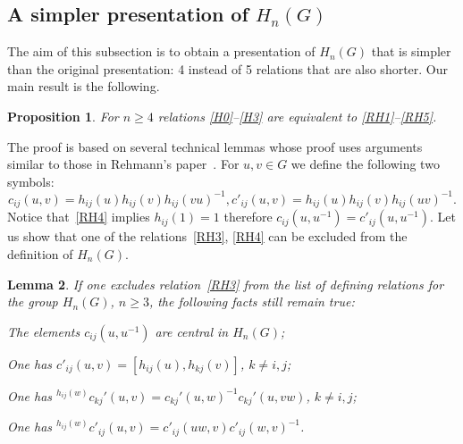 \documentclass[oneside, 12pt]{amsart}
\theoremstyle{plain}
\numberwithin{equation}{section}
\newtheorem{lemma}{Lemma}
\numberwithin{lemma}{section}
\newtheorem{prop}[lemma]{Proposition}
\theoremstyle{remark}
\theoremstyle{definition}
\begin{document}
\subsection{A simpler presentation of $H_n(G)$}
The aim of this subsection is to obtain a presentation of $H_n(G)$ that is simpler than the original presentation: 4 instead of 5 relations that are also shorter. 
Our main result is the following.
\begin{prop} \label{prop:simpler} For $n\geq 4$ %
relations \eqref{H0}--\eqref{H3} are equivalent to \eqref{RH1}--\eqref{RH5}.
\end{prop}
The proof is based on several technical lemmas whose proof uses arguments similar to those in Rehmann's paper~\cite{Reh78}.
For $u, v\in G$ we define the following two symbols:
\[c_{ij}(u,v)=h_{ij}(u)h_{ij}(v)h_{ij}(vu)^{-1}, c'_{ij}(u,v)=h_{ij}(u)h_{ij}(v)h_{ij}(uv)^{-1}.\]
Notice that~\eqref{RH4} implies $h_{ij}(1)=1$ therefore $c_{ij}(u, u^{-1}) = c'_{ij}(u, u^{-1})$.
Let us show that one of the relations~\eqref{RH3}, \eqref{RH4} can be excluded from the definition of $H_n(G)$.
\begin{lemma} \label{item-lem33} If one excludes relation~\eqref{RH3} from the list of defining relations for the group $H_n(G)$, $n\geq 3$,
 the following facts still remain true:
 \begin{lemlist}
\item \label{item-lem33-cntr} The elements $c_{ij}(u, u^{-1})$ are central in $H_n(G)$;
\item \label{item-lem33-comm} One has $c'_{ij}(u, v) = [h_{ij}(u), h_{kj}(v)]$, $k\neq i, j$;
\item \label{item-lem33-conj}  One has ${}^{h_{ij}(w)}c_{kj}'(u, v) = c_{kj}'(u, w)^{-1} c_{kj}'(u, vw)$, $k\neq i, j$;
\item \label{item-lem33-conj2} One has ${}^{h_{ij}(w)} c'_{ij}(u, v) = c'_{ij}(uw, v) c'_{ij}(w, v)^{-1}$.
 \end{lemlist}
\end{lemma}
\end{document}
